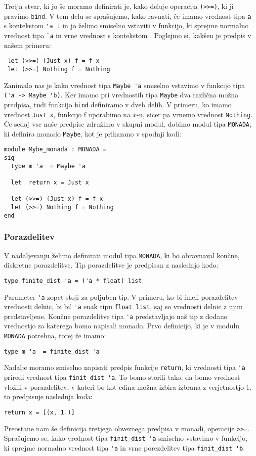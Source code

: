 \documentclass[a4paper,12pt]{article}
\theoremstyle{definition} %
\begin{document}
Tretja stvar, ki jo še moramo definirati je, kako deluje operacija \lstinline{(>>=)}, ki ji pravimo \lstinline{bind}. V tem delu se sprašujemo, kako ravnati, če imamo vrednost tipa \lstinline{a} s kontekstom \lstinline{'a t} in jo želimo smiselno vstaviti v funkcijo, ki sprejme normalno vrednost tipa \lstinline{`a} in vrne vrednost s kontekstom \cite{haskell}. Poglejmo si, kakšen je predpis v našem primeru:
\begin{lstlisting}
 let (>>=) (Just x) f = f x
 let (>>=) Nothing f = Nothing
\end{lstlisting}
Zanimalo nas je kako vrednost tipa \lstinline{Maybe 'a} smiselno vstavimo v funkcijo tipa \lstinline{('a -> Maybe 'b)}. Ker imamo pri vrednostih tipa \lstinline{Maybe} dva različna možna predpisa, tudi funkcijo \lstinline{bind} definiramo v dveh delih. V primeru, ko imamo vrednost \lstinline{Just x}, funkcijo f  uporabimo na $x$-u, sicer pa vrnemo vrednost \lstinline{Nothing}.
Če sedaj vse naše predpise združimo v skupni modul, dobimo modul tipa \lstinline{MONADA}, ki definira monado \lstinline{Maybe}, kot je prikazano v spodnji kodi:
\begin{lstlisting}
module Mybe_monada : MONADA =
sig
  type m 'a  = Maybe 'a

  let  return x = Just x

  let (>>=) (Just x) f = f x
  let (>>=) Nothing f = Nothing
end
\end{lstlisting}

\subsubsection*{Porazdelitev}

V nadaljevanju želimo definirati modul tipa \lstinline{MONADA}, ki bo obravnaval končne, diskretne porazdelitve. Tip porazdelitve je predpisan z naslednjo kodo: 
\begin{lstlisting}
type finite_dist 'a = ('a * float) list
\end{lstlisting}
Parameter \lstinline{'a} zopet stoji za poljuben tip. V primeru, ko bi imeli porazdelitev vrednosti delnic, bi bil \lstinline{'a} enak tipu \lstinline{float list}, saj so vrednosti delnic z njim predstavljene. Končne porazdelitve tipa \lstinline{'a} predstavljajo naš tip z dodano vrednostjo za katerega bomo napisali monado. Prvo definicijo, ki je v modulu \lstinline{MONADA} potrebna, torej že imamo:
 \begin{lstlisting}
type m 'a  = finite_dist 'a
\end{lstlisting}
Nadalje moramo smiselno napisati predpis funkcije \lstinline{return}, ki vrednosti tipa \lstinline{'a} priredi vrednost tipa \lstinline{finit_dist 'a}.  To bomo storili tako, da bomo vrednost vložili v porazdelitev, v kateri bo kot edina možna izbira izbrana z verjetnostjo 1, to predpisuje naslednja koda:
\begin{lstlisting}
return x = [(x, 1.)]
\end{lstlisting}
Preostane nam še definicija tretjega obveznega predpisa v monadi, operacije \lstinline{>>=}. Sprašujemo se, kako vrednost tipa \lstinline{finit_dist 'a}  smiselno vstavimo v funkcijo, ki sprejme normalno vrednost tipa \lstinline{'a} in vrne porezdelitev tipa \lstinline{finit_dist 'b}.
\end{document}
